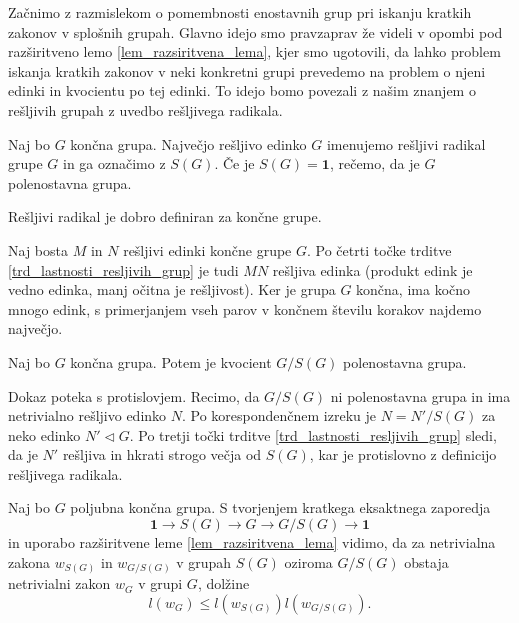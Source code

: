 \documentclass[mat1, tisk]{fmfdelo}
\numberwithin{equation}{section}  %
\begin{document}
Začnimo z razmislekom o pomembnosti enostavnih grup pri iskanju kratkih zakonov v splošnih grupah. Glavno idejo smo pravzaprav že videli v opombi pod razširitveno lemo \ref{lem_razsiritvena_lema}, kjer smo ugotovili, da
lahko problem iskanja kratkih zakonov v neki konkretni grupi prevedemo na problem o njeni edinki in kvocientu po tej edinki. To idejo bomo povezali z našim znanjem o rešljivih grupah z uvedbo rešljivega radikala.

\begin{definicija}
\label{def_resljiv_radikal}
Naj bo $G$ končna grupa. Največjo rešljivo edinko $G$ imenujemo rešljivi radikal grupe $G$ in ga označimo z $S(G)$. Če je $S(G) = \mathbf{1}$, rečemo, da je $G$ polenostavna grupa.
\end{definicija}
\begin{lema}
\label{lem_dobra_definiranost_resljivega_radikala}
Rešljivi radikal je dobro definiran za končne grupe.
\end{lema}
\begin{dokaz}
    Naj bosta $M$ in $N$ rešljivi edinki končne grupe $G$. Po četrti točke trditve \ref{trd_lastnosti_resljivih_grup} je tudi $MN$ rešljiva edinka (produkt edink je vedno edinka, manj očitna je rešljivost). Ker je grupa $G$ končna, ima kočno mnogo edink,
    s primerjanjem vseh parov v končnem številu korakov najdemo največjo. 
\end{dokaz}

\begin{lema}
\label{lem_resljiv_radikal_je_polenostaven}
Naj bo $G$ končna grupa. Potem je kvocient $G / S(G)$ polenostavna grupa. 
\end{lema}
\begin{dokaz}
    Dokaz poteka s protislovjem. Recimo, da $G / S(G)$ ni polenostavna grupa in ima netrivialno rešljivo edinko $N$. Po korespondenčnem izreku je $N = N' / S(G)$ za neko edinko $N' \triangleleft G$.
    Po tretji točki trditve \ref{trd_lastnosti_resljivih_grup} sledi, da je $N'$ rešljiva in hkrati strogo večja od $S(G)$, kar je protislovno z definicijo rešljivega radikala.
\end{dokaz}

Naj bo $G$ poljubna končna grupa. S tvorjenjem kratkega eksaktnega zaporedja \begin{equation*}
\mathbf{1} \to S(G) \to G \to  G / S(G) \to  \mathbf{1}
\end{equation*}  
in uporabo razširitvene leme \ref{lem_razsiritvena_lema} vidimo, da za netrivialna zakona $w_{S(G)}$ in $w_{G / S(G)}$ v grupah $S(G)$ oziroma $G / S(G)$ obstaja netrivialni zakon $w_G$ v grupi $G$, dolžine \begin{equation*}
l(w_G) \le  l(w_{S(G)}) l (w_{G / S(G)}).
\end{equation*}  
\end{document}
